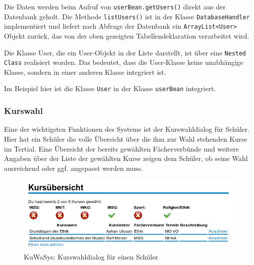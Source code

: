 Die Daten werden beim Aufruf von \texttt{userBean.getUsers()} direkt aus der Datenbank geholt. Die Methode \texttt{listUsers()} ist in der Klasse \texttt{DatabaseHandler} implementiert und liefert nach Abfrage der Datenbank ein \texttt{ArrayList<User>} Objekt zurück, das von der oben gezeigten Tabellendeklaration verarbeitet wird.


Die Klasse User, die ein User-Objekt in der Liste darstellt, ist über eine \texttt{Nested Class} realisiert worden. Das bedeutet, dass die User-Klasse keine unabhängige Klasse, sondern in einer anderen Klasse integriert ist. 

Im Beispiel hier ist die Klasse \texttt{User} in der Klasse \texttt{userBean} integriert.

	
		
\subsubsection{Kurswahl}
Eine der wichtigsten Funktionen des Systems ist der Kurswahldialog für Schüler. Hier hat ein Schüler die volle Übersicht über die ihm zur Wahl stehenden Kurse im Tertial. Eine Übersicht der bereits gewählten Fächerverbünde und weitere Angaben über der Liste der gewählten Kurse zeigen dem Schüler, ob seine Wahl ausreichend oder ggf. angepasst werden muss. 
\begin{figure}[h]
 \begin{center}
   \includegraphics[scale=0.7]{img/kurswahl_KuWaSys.png}
 \end{center}
 \caption[\textbf{KuWaSys: Kurswahldialog für einen Schüler}]{KuWaSys: Kurswahldialog für einen Schüler}
 \label{fig:kurswahl_KuWaSys}
\end{figure}

